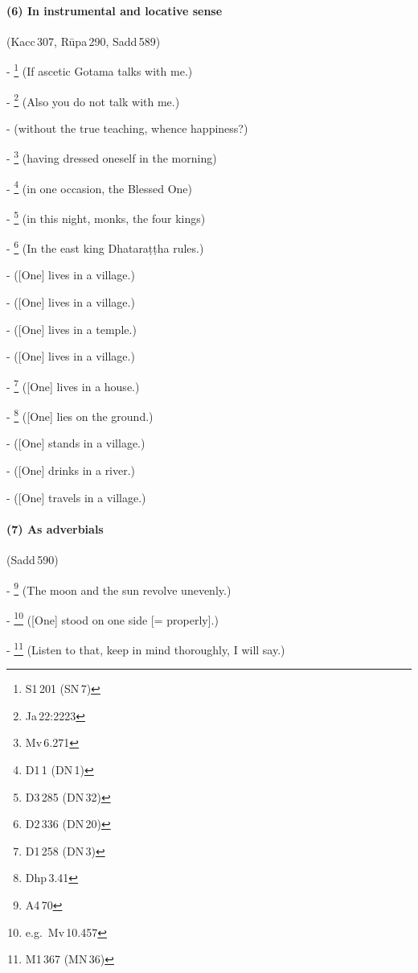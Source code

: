 \paragraph*{(6) In instrumental and locative sense} (Kacc\,307, R\=upa\,290, Sadd\,589)\par
- \footnote{S1\,201 (SN\,7)} (If ascetic Gotama talks with me.)\par
- \footnote{Ja\,22:2223} (Also you do not talk with me.)\par
-  (without the true teaching, whence happiness?)\par
- \footnote{Mv\,6.271} (having dressed oneself in the morning)\par
- \footnote{D1\,1 (DN\,1)} (in one occasion, the Blessed One)\par
- \footnote{D3\,285 (DN\,32)} (in this night, monks, the four kings)\par
- \footnote{D2\,336 (DN\,20)} (In the east king Dhatara\d t\d tha rules.)\par
-  ([One] lives in a village.)\par
-  ([One] lives in a village.)\par
-  ([One] lives in a temple.)\par
-  ([One] lives in a village.)\par
- \footnote{D1\,258 (DN\,3)} ([One] lives in a house.)\par
- \footnote{Dhp\,3.41} ([One] lies on the ground.)\par
-  ([One] stands in a village.)\par
-  ([One] drinks in a river.)\par
-  ([One] travels in a village.)\par

\paragraph*{(7) As adverbials} (Sadd\,590)\par
- \footnote{A4\,70} (The moon and the sun revolve unevenly.)\par
- \footnote{e.g.\ Mv\,10.457} ([One] stood on one side [= properly].)\par
- \footnote{M1\,367 (MN\,36)} (Listen to that, keep in mind thoroughly, I will say.)\par

